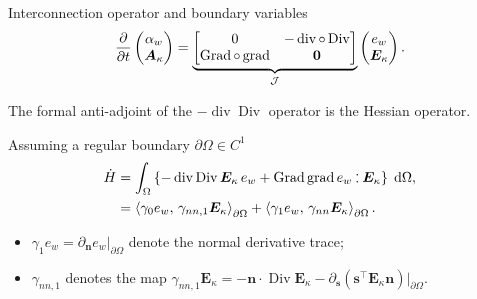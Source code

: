 \documentclass[aspectratio=169]{ISAE-Beamer}
\DeclareMathOperator*{\grad}{grad}
\DeclareMathOperator*{\Grad}{Grad}
\DeclareMathOperator*{\Div}{Div}
\renewcommand{\div}{\operatorname{div}}
\newcommand{\inner}[3][]{\ensuremath{\left\langle #2, \, #3 \right\rangle_{#1}}}
\def\onedot{$\mathsurround0pt\ldotp$}
\def\cddot{%
	\mathbin{\vcenter{\baselineskip.67ex
			\hbox{\onedot}\hbox{\onedot}}%
}}
\begin{document}
\begin{frame}{Interconnection operator and boundary variables}
\begin{equation*}
\diffp{}{t}
\begin{pmatrix}
\alpha_w \\
\bm{A}_{\kappa} \\
\end{pmatrix} = 
\underbrace{\begin{bmatrix}
0  &  - \div \circ \Div \\
\Grad \circ \grad & \bm{0} \\
\end{bmatrix}}_{\mathcal{J}}
\begin{pmatrix}
e_w \\
\bm{E}_{\kappa} \\
\end{pmatrix}.
\end{equation*}

\begin{theorem}
The formal anti-adjoint of the $-\div\Div$ operator is the Hessian operator.
\end{theorem}
Assuming a regular boundary $\partial\Omega \in C^1$
\begin{equation*}
\begin{aligned}
\dot{H}&= \int_{\Omega} \left\{ - \div\Div \bm{E}_{\kappa} \, e_w + \Grad\grad e_w \cddot \bm{E}_{\kappa} \right\} \d\Omega, \\
&=\inner[\partial\Omega]{\gamma_{0} e_w}{\gamma_{nn, 1}\bm{E}_\kappa} + \inner[\partial\Omega]{\gamma_{1} e_w}{\gamma_{nn}\bm{E}_\kappa}.  
\end{aligned}
\end{equation*}
\begin{itemize}
	\item $\gamma_{1} e_w = \partial_{\bm{n}} e_w \vert_{\partial\Omega}$ denote the normal derivative trace;
	\item $\gamma_{nn, 1}$ denotes the map $\gamma_{nn, 1}\bm{E}_\kappa = -\bm{n} \cdot \Div \bm{E}_\kappa - \partial_{\bm{s}} (\bm{s}^\top\bm{E}_\kappa\bm{n})\vert_{\partial\Omega}$.
\end{itemize}
\end{frame}
\end{document}
